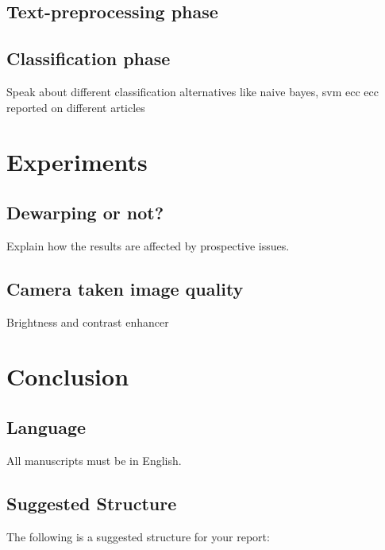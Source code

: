 \documentclass[10pt,twocolumn,letterpaper]{article}
\begin{document}
\subsection{Text-preprocessing phase}

\subsection{Classification phase}
Speak about different classification alternatives like naive bayes, svm ecc ecc reported on different  articles




\section{Experiments}

\subsection{Dewarping or not?}
Explain how the results are affected by prospective issues.

\subsection{Camera taken image quality}
Brightness and contrast enhancer 

\section{Conclusion}




\subsection{Language}

All manuscripts must be in English.

\subsection{Suggested Structure}

The following is a suggested structure for your report:
\end{document}
